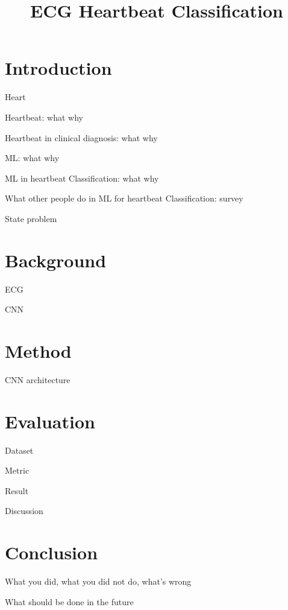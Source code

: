 \documentclass[conference]{IEEEtran}
\title{ECG Heartbeat Classification}
\begin{document}
\maketitle

\section{Introduction}

Heart

Heartbeat: what why

Heartbeat in clinical diagnosis: what why

ML: what why 

ML in heartbeat Classification: what why

What other people do in ML for heartbeat Classification: survey

State problem

\section{Background}

ECG 

CNN 

\section{Method}

CNN architecture

\section{Evaluation}

Dataset

Metric

Result

Discussion

\section{Conclusion}

What you did, what you did not do, what's wrong

What should be done in the future
\end{document}
